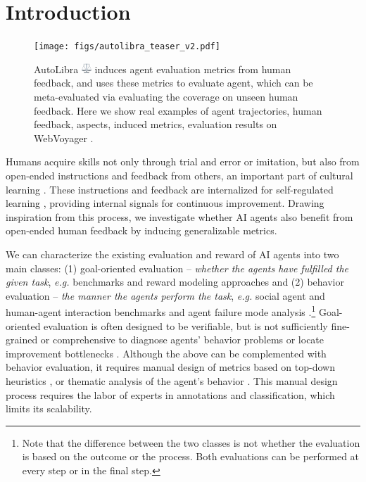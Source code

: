 \section{Introduction}
\begin{figure}[!t]
    \centering
    \vspace{-30pt}
    \texttt{[image: figs/autolibra\_teaser\_v2.pdf]}
    \vspace{-20pt}
    \caption{AutoLibra \protect\includegraphics[height=1em]{figs/scale.png} induces agent evaluation metrics from human feedback, and uses these metrics to evaluate agent, which can be meta-evaluated via evaluating the coverage on unseen human feedback. Here we show real examples of agent trajectories, human feedback, aspects, induced metrics, evaluation results on WebVoyager \citep{he2024webvoyager}.}
    \vspace{-20pt}
    \label{fig:teaser}
\end{figure}

Humans acquire skills not only through trial and error or imitation, but also from open-ended instructions and feedback from others, an important part of cultural learning \citep{tomasello1993cultural}.  
These instructions and feedback are internalized for self-regulated learning
\citep{pintrich2002development,nicol2006formative},
providing internal signals for continuous improvement. 
Drawing inspiration from this process, we investigate whether AI agents also benefit from open-ended human feedback by inducing generalizable metrics. 

We can characterize the existing evaluation and reward of AI agents
into two main classes: (1) goal-oriented evaluation --
\emph{whether the agents have fulfilled the given task},
\emph{e.g.} benchmarks \citep{zhouwebarena,jimenezswe,chan2024mle,paglieri2024balrog} and reward
modeling approaches \citep{pan2024autonomous,chen2025scaling,choudhury2025process}
and (2) behavior evaluation -- \emph{the manner the agents perform the task},
\emph{e.g.} social agent and human-agent interaction benchmarks \citep{zhousotopia,shao2024collaborative}
and agent failure mode analysis \citep{pan2025why,zhang2023effects,yang2023behavioral}.\footnote{Note that the difference between the two classes is not whether the evaluation is based on the outcome or the process.
Both evaluations can be performed at every step or in the final step.}
Goal-oriented evaluation is often designed to be verifiable, but is not sufficiently fine-grained
or comprehensive to diagnose agents' behavior problems or locate improvement bottlenecks \citep{yehudai2025survey}.  
Although the above can be complemented with behavior evaluation, it requires manual design of metrics based on top-down heuristics
\citep{zhousotopia}, or thematic analysis of the agent's behavior \citep{shao2024collaborative,pan2025why}.
This manual design process requires the labor of experts in annotations and classification, which limits its scalability.

